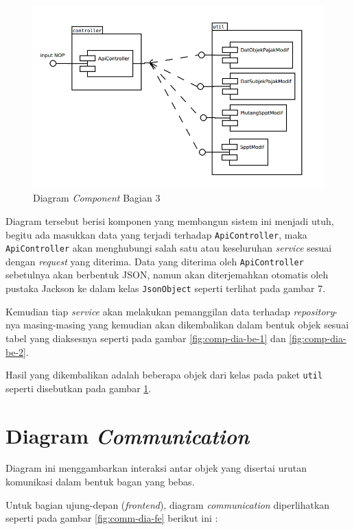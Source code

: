 \begin{figure}[H]
	\centering
	\includegraphics[width=1\textwidth]{./resources/uml/comp-dia-backend-3}
	\caption{Diagram \textit{Component} Bagian 3}
	\label{fig:comp-dia-be-3}
\end{figure}

Diagram tersebut berisi komponen yang membangun sistem ini menjadi utuh, begitu ada masukkan data yang terjadi terhadap \texttt{ApiController}, maka \texttt{ApiController} akan menghubungi salah satu atau keseluruhan \textit{service} sesuai dengan \textit{request} yang diterima. Data yang diterima oleh \texttt{ApiController} sebetulnya akan berbentuk JSON, namun akan diterjemahkan otomatis oleh pustaka Jackson ke dalam kelas \texttt{JsonObject} seperti terlihat pada gambar 7.

Kemudian tiap \textit{service} akan melakukan pemanggilan data terhadap \textit{repository}-nya masing-masing yang kemudian akan dikembalikan dalam bentuk objek sesuai tabel yang diaksesnya seperti pada gambar \ref{fig:comp-dia-be-1} dan \ref{fig:comp-dia-be-2}.

Hasil yang dikembalikan adalah beberapa objek dari kelas pada paket \texttt{util} seperti disebutkan pada gambar \ref{fig:comp-dia-be-3}.

\section{Diagram \textit{Communication}}

Diagram ini menggambarkan interaksi antar objek yang disertai urutan komunikasi dalam bentuk bagan yang bebas.

Untuk bagian ujung-depan (\textit{frontend}), diagram \textit{communication} diperlihatkan seperti pada gambar \ref{fig:comm-dia-fe} berikut ini :

